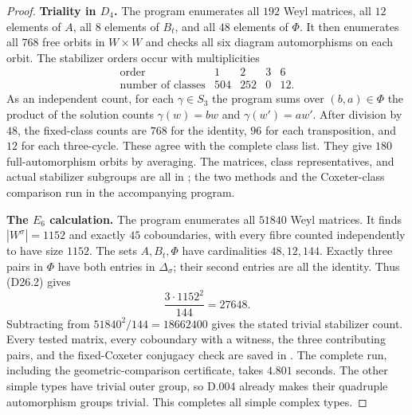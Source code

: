 \begin{proof}
\medskip\noindent\textbf{Triality in $D_4$.}
The program enumerates all $192$ Weyl matrices, all $12$ elements
of $A$, all $8$ elements of $B_t$, and all $48$ elements of $\Phi$.
It then enumerates all $768$ free orbits in $W\times W$ and
checks all six diagram automorphisms on each orbit.
The stabilizer orders occur with multiplicities
\[
\begin{array}{c|rrrr}
\text{order}&1&2&3&6\\\hline
\text{number of classes}&504&252&0&12.
\end{array}
\]
As an independent count, for each $\gamma\in S_3$ the program
sums over $(b,a)\in\Phi$ the product of the solution counts
$\gamma(w)=bw$ and $\gamma(w')=aw'$.
After division by $48$, the fixed-class counts are
$768$ for the identity, $96$ for each transposition, and $12$
for each three-cycle.  These agree with the complete class list.
They give $180$ full-automorphism orbits by averaging.
The matrices, class representatives, and actual stabilizer subgroups
are all in ; the two methods
and the Coxeter-class comparison run in the accompanying program.

\medskip\noindent\textbf{The $E_6$ calculation.}
The program enumerates all $51840$ Weyl matrices.
It finds $|W^\sigma|=1152$ and exactly $45$ coboundaries,
with every fibre counted independently to have size $1152$.
The sets $A,B_t,\Phi$ have cardinalities $48,12,144$.
Exactly three pairs in $\Phi$ have both entries in
$\Delta_\sigma$; their second entries are all the identity.
Thus (D26.2) gives
\[
 \frac{3\cdot1152^2}{144}=27648.
\]
Subtracting from $51840^2/144=18662400$ gives the stated trivial
stabilizer count.  Every tested matrix, every coboundary with a
witness, the three contributing pairs, and the fixed-Coxeter
conjugacy check are saved in .
The complete run, including the geometric-comparison certificate,
takes $4.801$ seconds.  The other simple types have trivial outer
group, so D.004 already makes their quadruple automorphism groups
trivial.  This completes all simple complex types.
\end{proof}
